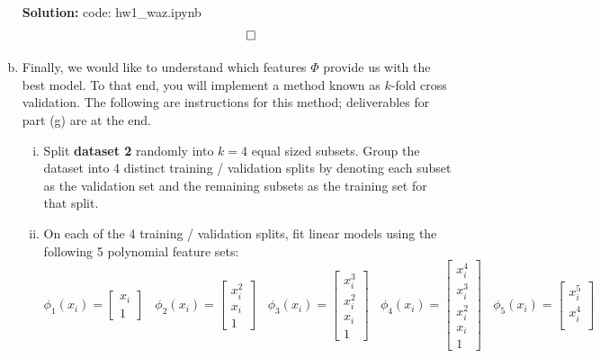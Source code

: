 \documentclass{article}
\newenvironment{solution}{\color{blue} \smallskip \textbf{Solution:}}{}
\begin{document}
\begin{enumerate}[(a)]
\begin{solution}
        code: hw1\_waz.ipynb
        \[ \qedhere \]
    \end{solution}
    
    \item
    Finally, we would like to understand which features $\Phi$ provide us with the best model. 
    To that end, you will implement a method known as $k$-fold cross validation. 
    The following are instructions for this method; deliverables for part (g) are at the end.
    \begin{enumerate}[(i)]
        \item 
        Split \textbf{dataset 2} randomly into $k=4$ equal sized subsets. 
        Group the dataset into 4 distinct training / validation splits by denoting each subset as the validation set and the remaining subsets as the training set for that split.
        \item 
        On each of the 4 training / validation splits, fit linear models using the following 5 polynomial feature sets:
        \[
            \phi_1(x_i) = \begin{bmatrix}
                x_i \\
                1
            \end{bmatrix}
            ~~~~
            \phi_2(x_i) = \begin{bmatrix}
                x_i^2 \\
                x_i \\
                1
            \end{bmatrix}
            ~~~~
            \phi_3(x_i) = \begin{bmatrix}
                x_i^3 \\
                x_i^2 \\
                x_i \\
                1
            \end{bmatrix}
            ~~~~
            \phi_4(x_i) = \begin{bmatrix}
                x_i^4 \\
                x_i^3 \\
                x_i^2 \\
                x_i \\
                1
            \end{bmatrix}
            ~~~~
            \phi_5(x_i) = \begin{bmatrix}
                x_i^5 \\
                x_i^4 \\

\end{bmatrix}\]
\end{enumerate}
\end{enumerate}
\end{document}
